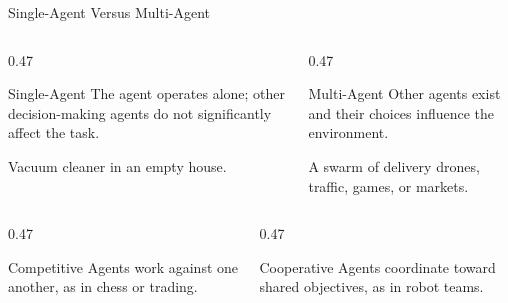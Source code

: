 \documentclass[aspectratio=169,10pt]{beamer}
\begin{document}
\begin{frame}{Single-Agent Versus Multi-Agent}
  \begin{columns}[T,onlytextwidth]
    \begin{column}{0.47\textwidth}
      \begin{block}{Single-Agent}
        The agent operates alone; other decision-making agents do not significantly affect the task.
      \end{block}
      \begin{exampleblockcp}
        Vacuum cleaner in an empty house.
      \end{exampleblockcp}
    \end{column}
    \begin{column}{0.47\textwidth}
      \begin{block}{Multi-Agent}
        Other agents exist and their choices influence the environment.
      \end{block}
      \begin{exampleblockcp}
        A swarm of delivery drones, traffic, games, or markets.
      \end{exampleblockcp}
    \end{column}
  \end{columns}
  \vspace{0.08in}
  \begin{columns}[T,onlytextwidth]
    \begin{column}{0.47\textwidth}
      \begin{block}{Competitive}
        Agents work against one another, as in chess or trading.
      \end{block}
    \end{column}
    \begin{column}{0.47\textwidth}
      \begin{block}{Cooperative}
        Agents coordinate toward shared objectives, as in robot teams.
      \end{block}
    \end{column}
  \end{columns}
\end{frame}
\end{document}
